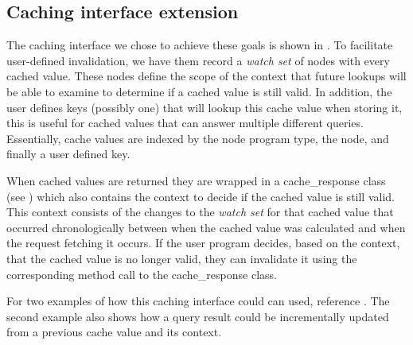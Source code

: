 \documentclass[letterpaper,twocolumn,11pt,tight]{article}
\begin{document}
\subsection{Caching interface extension}

The caching interface we chose to achieve these goals is shown in . To facilitate user-defined invalidation, we have them record a \emph{watch set} of nodes with every cached value. These nodes define the scope of the context that future lookups will be able to examine to determine if a cached value is still valid. 
In addition, the user defines keys (possibly one) that will lookup this cache value when storing it, this is useful for cached values that can answer multiple different queries. 
Essentially, cache values are indexed by the node program type, the node, and finally a user defined key. 

    When cached values are returned they are wrapped in a cache\_response class (see ) which also contains the context to decide if the cached value is still valid. This context consists of the changes to the \emph{watch set} for that cached value that occurred chronologically between when the cached value was calculated and when the request fetching it occurs. If the user program decides, based on the context, that the cached value is no longer valid, they can invalidate it using the corresponding method call to the cache\_response class.
    
    For two examples of how this caching interface could can used, reference . The second example also shows how a query result could be incrementally updated from a previous cache value and its context.
\end{document}
